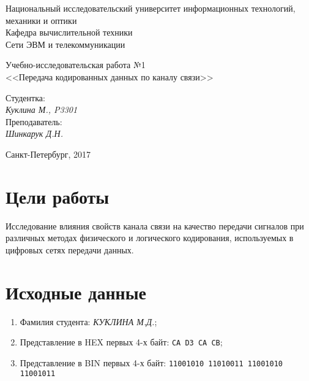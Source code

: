 \documentclass[12pt, a4paper] {ncc}
\begin{document}
\frenchspacing
\pagestyle{empty}
\begin{center}
     Национальный исследовательский университет информационных технологий,
                              механики и оптики\\
                        Кафедра вычислительной техники\\
                          Сети ЭВМ и телекоммуникации
\end{center}
\begin{center}
                            Учебно-исследовательская работа №1\\
                <<Передача кодированных данных по каналу связи>>
\end{center}
\begin{flushright}
                                          Студентка:\\
                                                         {\it Куклина М., P3301} \\
										  Преподаватель:\\
														 {\it Шинкарук Д.Н. }
\end{flushright}
\begin{center}
                             Санкт-Петербург, 2017
\end{center}
\newpage


\section*{Цели работы}
    Исследование влияния свойств канала связи на качество передачи
    сигналов при различных методах физического и логического кодирования,
    используемых в цифровых сетях передачи данных.

\section*{Исходные данные}

\begin{enumerate}
        \item Фамилия студента: \textsl{КУКЛИНА М.Д.};
        \item Представление в HEX первых 4-х байт: \texttt{CA D3 CA CB};
        \item Представление в BIN первых 4-х байт: \texttt{11001010 11010011 11001010 11001011}
\end{enumerate}
\end{document}
